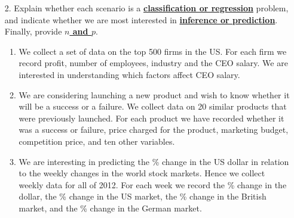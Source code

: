 \documentclass[12pt,a4paper]{article}%
\theoremstyle{definition}
\theoremstyle{plain}
\numberwithin{equation}{section}
\begin{document}
\begin{enumerate}
\item[2.] Explain whether each scenario is a \underline{\textbf{classification or regression}} problem,
and indicate whether we are most interested in \underline{\textbf{inference or prediction}}. Finally, provide \underline{\textbf{$n$ and $p$}}.
    \begin{enumerate}
        \item We collect a set of data on the top 500 firms in the US. For each firm we record profit, number of employees, industry and the CEO salary.
              We are interested in understanding which factors affect CEO salary.
        \item We are considering launching a new product and wish to know whether it will be a success or a failure.
              We collect data on 20 similar products that were previously launched.
              For each product we have recorded whether it was a success or failure, price charged for the product, marketing budget, competition price, and ten other variables.
        \item We are interesting in predicting the \% change in the US dollar in relation to the weekly changes in the world stock markets.
              Hence we collect weekly data for all of 2012. For each week we record the \% change in the dollar, the \% change in the US market, the \% change in the British market,
              and the \% change in the German market.
    \end{enumerate}
\end{enumerate}
\end{document}
